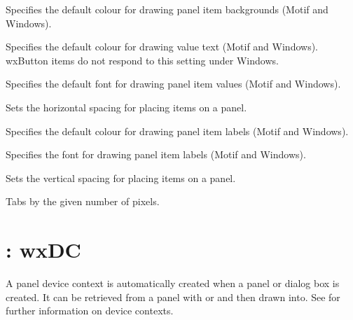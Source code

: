 Specifies the default colour for drawing panel item backgrounds (Motif and Windows).



Specifies the default colour for drawing value text (Motif and Windows).
wxButton items do not respond to this setting under Windows.



Specifies the default font for drawing panel item values (Motif and Windows).



Sets the horizontal spacing for placing items on a panel.



Specifies the default colour for drawing panel item labels (Motif and Windows).



Specifies the font for drawing panel item labels (Motif and Windows).



Sets the vertical spacing for placing items on a panel.



Tabs by the given number of pixels.

\section{: wxDC}\label{wxpaneldc}

A panel device context is automatically created when a panel or dialog box is created.
It can be retrieved from a panel with  or
 and then
drawn into. See  for further information on device contexts.

